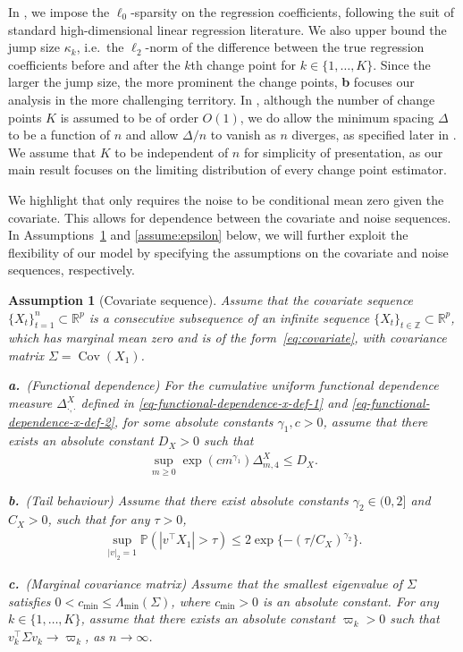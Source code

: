 \documentclass[11pt]{article}
\DeclareMathOperator*{\cov}{Cov}
\theoremstyle{plain}
\newtheorem{assumption}{Assumption}
\theoremstyle{definition}
\begin{document}
In , we impose the $\ell_0$-sparsity on the regression coefficients, following the suit of standard high-dimensional linear regression literature.  We also upper bound the jump size $\kappa_k$, i.e.\ the $\ell_2$-norm of the difference between the true regression coefficients before and after the $k$th change point for $k \in \{1, \ldots, K\}$. Since the larger the jump size, the more prominent the change points, \textbf{b} focuses our analysis in the more challenging territory.   In , although the number of change points $K$ is assumed to be of order $O(1)$, we do allow the minimum spacing $\Delta$ to be a function of $n$ and allow $\Delta/n$ to vanish as $n$ diverges, as specified later in .  We assume that $K$ to be independent of $n$ for simplicity of presentation, as our main result  focuses on the limiting distribution of every change point estimator.  

We highlight that  only requires the noise to be conditional mean zero given the covariate.  This allows for dependence between the covariate and noise sequences. In Assumptions~\ref{assume:X} and \ref{assume:epsilon} below, we will further exploit the flexibility of our model by specifying the assumptions on the covariate and noise sequences, respectively.  


\begin{assumption}[Covariate sequence] \label{assume:X}
Assume that the covariate sequence $\{X_t\}_{t = 1}^n \subset \mathbb R^p$ is a consecutive subsequence of an infinite sequence $\{X_t\}_{t \in \mathbb{Z}} \subset \mathbb R^p$, which has marginal mean zero and is of the form~\eqref{eq:covariate}, with covariance matrix $\Sigma = \cov(X_1)$.

\noindent \textbf{a.}~(Functional dependence) For the cumulative uniform functional dependence measure $\Delta_{\cdot, \cdot}^X$ defined in \eqref{eq-functional-dependence-x-def-1} and \eqref{eq-functional-dependence-x-def-2}, for some absolute constants $\gamma_1, c > 0$, assume that there exists an absolute constant $D_X > 0$ such that
\begin{align}\label{eq:X temporal dependence}
    \sup_{m \geq 0}\exp(cm^{\gamma_1})\Delta_{m,4}^X \leq D_X.
\end{align}  

\noindent \textbf{b.}~(Tail behaviour) Assume that there exist absolute constants $\gamma_2 \in (0, 2]$ and $C_X > 0$, such that for any $\tau > 0$, 
\begin{align}\label{eq:X subGaussian}
    \sup_{|v|_2=1 }\mathbb{P}(|v^\top X_1| > \tau) \leq 2\exp\{-(\tau/C_X)^{\gamma_2}\}.
\end{align}

\noindent \textbf{c.}~(Marginal covariance matrix) Assume that the smallest eigenvalue of $\Sigma$ satisfies $0 < c_{\min} \leq \Lambda_{\min}(\Sigma)$, where $c_{\min} > 0$ is an absolute constant.  For any $k \in \{1, \ldots, K\}$, assume that there exists an absolute constant $\varpi_k > 0$ such that $v_k^{\top}\Sigma v_k \to \varpi_k$, as $n \to \infty$.
\end{assumption}
\end{document}
